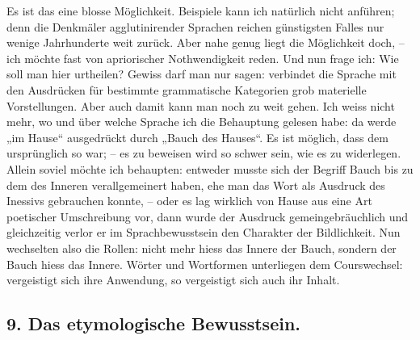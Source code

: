 Es ist das eine blosse Möglichkeit. Beispiele kann ich natürlich nicht anführen; denn die Denkmäler agglutinirender Sprachen reichen günstigsten Falles nur wenige Jahrhunderte weit zurück. Aber nahe genug liegt die Möglichkeit doch, – ich möchte fast von apriorischer Nothwendigkeit reden. Und nun \label{sp.404} frage ich: Wie soll man hier urtheilen? Gewiss darf man nur sagen:  verbindet die Sprache mit den Ausdrücken für bestimmte grammatische Kategorien grob materielle Vorstellungen. Aber auch damit kann man noch zu weit gehen. Ich weiss nicht mehr, wo und über welche Sprache ich die Behauptung gelesen habe: da werde „im Hause“ ausgedrückt durch „Bauch des Hauses“. Es ist möglich, dass dem ursprünglich so war; – es zu beweisen wird so schwer sein, wie es zu widerlegen. Allein soviel möchte ich behaupten: entweder musste sich der Begriff Bauch bis zu dem des Inneren verallgemeinert haben, ehe man das Wort als Ausdruck des Inessivs gebrauchen konnte, – oder es lag wirklich von Hause aus eine Art poetischer Umschreibung vor, dann wurde der Ausdruck gemeingebräuchlich und gleichzeitig verlor er im Sprachbewusstsein den Charakter der Bildlichkeit. Nun wechselten also die Rollen: nicht mehr hiess das Innere der Bauch, sondern der Bauch hiess das Innere. Wörter und Wortformen unterliegen dem Courswechsel: vergeistigt sich ihre Anwendung, so vergeistigt sich auch ihr Inhalt.

\label{fp.385}

\subsection*{9. Das etymologische Bewusstsein.}\label{IV.IV.9}

